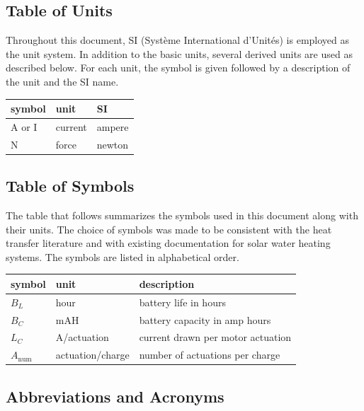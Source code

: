 \documentclass[12pt]{article}
\begin{document}
\subsection{Table of Units}

Throughout this document, SI (Syst\`{e}me International d'Unit\'{e}s) is employed
as the unit system.  In addition to the basic units, several derived units are
used as described below.  For each unit, the symbol is given followed by a
description of the unit and the SI name.
~\newline

\renewcommand{\arraystretch}{1.2}
\begin{table}[ht]
  \noindent \begin{tabular}{l l l} 
    \toprule		
    \textbf{symbol} & \textbf{unit} & \textbf{SI}\\
    \midrule 
    \si{\ampere} or I& current & ampere\\
    \si{\newton} & force & newton\\
    \bottomrule
  \end{tabular}
\end{table}

\subsection{Table of Symbols}

The table that follows summarizes the symbols used in this document along with
their units.  The choice of symbols was made to be consistent with the heat
transfer literature and with existing documentation for solar water heating
systems.  The symbols are listed in alphabetical order.

\renewcommand{\arraystretch}{1.2}
\noindent \begin{longtable*}{l l p{12cm}} \toprule
\textbf{symbol} & \textbf{unit} & \textbf{description}\\
\midrule 
$B_L$ & hour & battery life in hours\\
$B_C$ & mAH & battery capacity in amp hours\\
$L_C$ & A/actuation & current drawn per motor actuation\\
$A_\text{num}$ & actuation/charge & number of actuations per charge\\ 
\bottomrule
\end{longtable*}


\subsection{Abbreviations and Acronyms}
\end{document}

